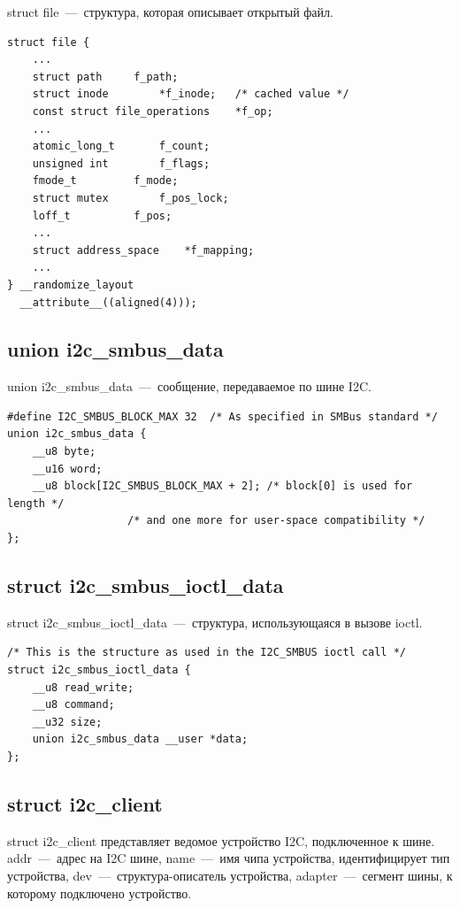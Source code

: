 struct file~---~структура, которая описывает открытый файл.

\begin{lstlisting}[label=struct_file,caption=struct file]
struct file {
	...
	struct path		f_path;
	struct inode		*f_inode;	/* cached value */
	const struct file_operations	*f_op;
	...
	atomic_long_t		f_count;
	unsigned int 		f_flags;
	fmode_t			f_mode;
	struct mutex		f_pos_lock;
	loff_t			f_pos;
	...
	struct address_space	*f_mapping;
	...
} __randomize_layout
  __attribute__((aligned(4)));
\end{lstlisting}

\subsection{union i2c\_smbus\_data}

union i2c\_smbus\_data~---~сообщение, передаваемое по шине I2C.

\begin{lstlisting}[label=union_i2c_smbus_data,caption=union i2c\_smbus\_data]
#define I2C_SMBUS_BLOCK_MAX	32	/* As specified in SMBus standard */
union i2c_smbus_data {
	__u8 byte;
	__u16 word;
	__u8 block[I2C_SMBUS_BLOCK_MAX + 2]; /* block[0] is used for length */
			       /* and one more for user-space compatibility */
};
\end{lstlisting}

\subsection{struct i2c\_smbus\_ioctl\_data}

struct i2c\_smbus\_ioctl\_data~---~структура, использующаяся в вызове ioctl.

\begin{lstlisting}[label=struct_i2c_smbus_ioctl_data,caption=struct i2c\_smbus\_ioctl\_data]
/* This is the structure as used in the I2C_SMBUS ioctl call */
struct i2c_smbus_ioctl_data {
	__u8 read_write;
	__u8 command;
	__u32 size;
	union i2c_smbus_data __user *data;
};
\end{lstlisting}

\subsection{struct i2c\_client}

struct i2c\_client представляет ведомое устройство I2C, подключенное к шине. addr~---~адрес на I2C шине, name~---~имя чипа устройства, идентифицирует тип устройства, dev~---~структура-описатель устройства, adapter~---~сегмент шины, к которому подключено устройство.

